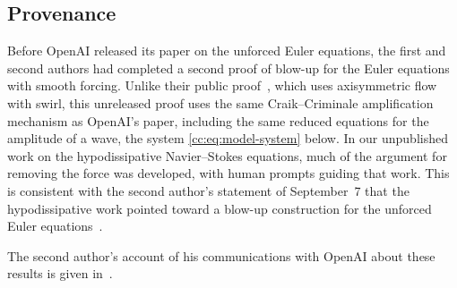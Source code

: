 \subsection{Provenance}\label{cc:sec:provenance}

Before OpenAI released its paper on the unforced Euler equations, the first
and second authors had completed a second proof of blow-up for the Euler equations
with smooth forcing. Unlike their public
proof~\cite{AlpogeBuckmasterForcedEuler}, which uses axisymmetric flow
with swirl, this unreleased proof uses the same Craik--Criminale
amplification mechanism as OpenAI's paper, including the same reduced
equations for the amplitude of a wave, the system
\eqref{cc:eq:model-system} below. In our
unpublished work on the hypodissipative Navier--Stokes equations, much of the argument
for removing the force was developed, with human prompts guiding that
work. This is consistent with the second author's statement of
September~7 that the hypodissipative work pointed toward a blow-up
construction for the unforced Euler equations~\cite{BuckmasterSeptemberStatement}.

The second author's account of his communications with OpenAI about
these results is given in~\cite{BuckmasterSeptemberStatement}.
